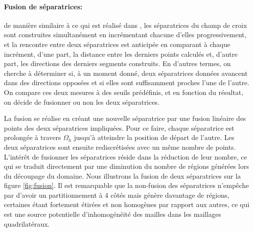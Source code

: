 \paragraph{Fusion de séparatrices:}

de manière similaire à ce qui est réalisé dans \cite{marcon2019high}, les séparatrices du champ de croix sont construites simultanément en incrémentant chacune d'elles progressivement, et la rencontre entre deux séparatrices est anticipée en comparant à chaque incrément, d'une part, la distance entre les derniers points calculés et, d'autre part, les directions des derniers segments construits. En d'autres termes, on cherche à déterminer si, à un moment donné, deux séparatrices données avancent dans des directions opposées et si elles sont suffisamment proches l'une de l'autre. On compare ces deux mesures à des seuils prédéfinis, et en fonction du résultat, on décide de fusionner ou non les deux séparatrices.

La fusion se réalise en créant une nouvelle séparatrice par une fusion linéaire des points des deux séparatrices impliquées. Pour ce faire, chaque séparatrice est prolongée à travers $\Omega_h$ jusqu'à atteindre la position de départ de l'autre. Les deux séparatrices sont ensuite rediscrétisées avec un même nombre de points. L'intérêt de fusionner les séparatrices réside dans la réduction de leur nombre, ce qui se traduit directement par une diminution du nombre de régions générées lors du découpage du domaine. Nous illustrons la fusion de deux séparatrices sur la figure \ref{fig:fusion}. Il est remarquable que la non-fusion des séparatrices n'empêche par d'avoir un partitionnement à 4 côtés mais génère davantage de régions, certaines étant fortement étirées et non homogènes par rapport aux autres, ce qui est une source potentielle d'inhomogénéité des mailles dans les maillages quadrilatéraux.

